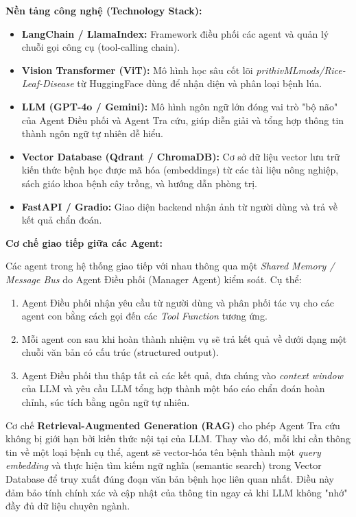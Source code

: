 \documentclass[12pt,a4paper]{article}
\begin{document}
\textbf{Nền tảng công nghệ (Technology Stack):}
\begin{itemize}
    \item \textbf{LangChain / LlamaIndex:} Framework điều phối các agent và quản lý chuỗi gọi công cụ (tool-calling chain).
    \item \textbf{Vision Transformer (ViT):} Mô hình học sâu cốt lõi \textit{prithivMLmods/Rice-Leaf-Disease} từ HuggingFace dùng để nhận diện và phân loại bệnh lúa.
    \item \textbf{LLM (GPT-4o / Gemini):} Mô hình ngôn ngữ lớn đóng vai trò "bộ não" của Agent Điều phối và Agent Tra cứu, giúp diễn giải và tổng hợp thông tin thành ngôn ngữ tự nhiên dễ hiểu.
    \item \textbf{Vector Database (Qdrant / ChromaDB):} Cơ sở dữ liệu vector lưu trữ kiến thức bệnh học được mã hóa (embeddings) từ các tài liệu nông nghiệp, sách giáo khoa bệnh cây trồng, và hướng dẫn phòng trị.
    \item \textbf{FastAPI / Gradio:} Giao diện backend nhận ảnh từ người dùng và trả về kết quả chẩn đoán.
\end{itemize}

\textbf{Cơ chế giao tiếp giữa các Agent:}

Các agent trong hệ thống giao tiếp với nhau thông qua một \textit{Shared Memory / Message Bus} do Agent Điều phối (Manager Agent) kiểm soát. Cụ thể:
\begin{enumerate}
    \item Agent Điều phối nhận yêu cầu từ người dùng và phân phối tác vụ cho các agent con bằng cách gọi đến các \textit{Tool Function} tương ứng.
    \item Mỗi agent con sau khi hoàn thành nhiệm vụ sẽ trả kết quả về dưới dạng một chuỗi văn bản có cấu trúc (structured output).
    \item Agent Điều phối thu thập tất cả các kết quả, đưa chúng vào \textit{context window} của LLM và yêu cầu LLM tổng hợp thành một báo cáo chẩn đoán hoàn chỉnh, súc tích bằng ngôn ngữ tự nhiên.
\end{enumerate}

Cơ chế \textbf{Retrieval-Augmented Generation (RAG)} cho phép Agent Tra cứu không bị giới hạn bởi kiến thức nội tại của LLM. Thay vào đó, mỗi khi cần thông tin về một loại bệnh cụ thể, agent sẽ vector-hóa tên bệnh thành một \textit{query embedding} và thực hiện tìm kiếm ngữ nghĩa (semantic search) trong Vector Database để truy xuất đúng đoạn văn bản bệnh học liên quan nhất. Điều này đảm bảo tính chính xác và cập nhật của thông tin ngay cả khi LLM không "nhớ" đầy đủ dữ liệu chuyên ngành.
\end{document}
